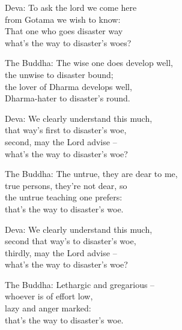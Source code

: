 \begin{MyDescription}{Deva:}   
To ask the lord we come here\\
from Gotama we wish to know:\\
That one who goes disaster way\\
what's the way to disaster's woes?
\end{MyDescription}

\begin{MyDescription}{The Buddha:}   
The wise one does develop well,\\
the unwise to disaster bound;\\
the lover of Dharma develops well,\\
Dharma-hater to disaster's round.
\end{MyDescription}
    
\begin{MyDescription}{Deva:}   
We clearly understand this much,\\
that way's first to disaster's woe,\\
second, may the Lord advise – \\
what's the way to disaster's woe?
\end{MyDescription}

\begin{MyDescription}{The Buddha:}   
The untrue, they are dear to me,\\
true persons, they're not dear, so\\
the untrue teaching one prefers:\\
that's the way to disaster's woe.
\end{MyDescription}  
 
\begin{MyDescription}{Deva:}   
We clearly understand this much,\\
second that way's to disaster's woe,\\
thirdly, may the Lord advise – \\
what's the way to disaster's woe?	
\end{MyDescription} 
   
\begin{MyDescription}{The Buddha:}   
Lethargic and gregarious –\\
whoever is of effort low,\\
lazy and anger marked:\\
that's the way to disaster's woe.
\end{MyDescription} 
   
